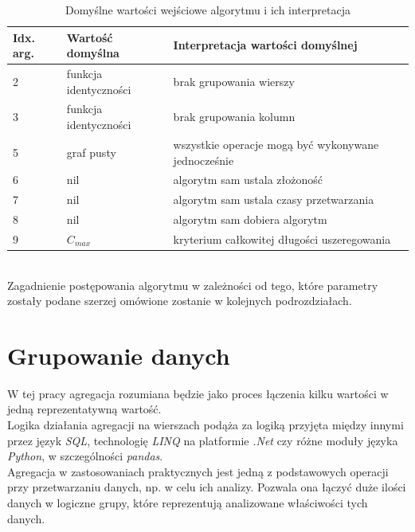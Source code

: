 \documentclass[brudnopis]{xmgr}
\begin{document}

\begin{table}[!tbh]
\begin{tabular}{|l|l|l|} \hline
Idx. arg. & Wartość domyślna & Interpretacja wartości domyślnej \\ \hline
2 & funkcja identyczności   & brak grupowania wierszy \\ \hline
3 & funkcja identyczności   & brak grupowania kolumn \\ \hline
5 & graf pusty              & wszystkie operacje mogą być wykonywane jednocześnie \\ \hline
6 & nil                     & algorytm sam ustala złożoność \\ \hline
7 & nil                     & algorytm sam ustala czasy przetwarzania \\ \hline
8 & nil                     & algorytm sam dobiera algorytm \\ \hline
9 & $C_{max}$               & kryterium całkowitej długości uszeregowania \\ \hline
\end{tabular}
\caption{Domyślne wartości wejściowe algorytmu i ich interpretacja\label{tab:args-default}}
\end{table}
\medskip\\

Zagadnienie postępowania algorytmu w zależności od tego, które parametry zostały podane szerzej omówione zostanie w kolejnych podrozdziałach.

\section{Grupowanie danych}

W tej pracy agregacja rozumiana będzie jako proces łączenia kilku wartości w jedną reprezentatywną wartość.
\medskip\\

Logika działania agregacji na wierszach podąża za logiką przyjęta między innymi przez język \emph{SQL}, technologię \emph{LINQ} na platformie \emph{.Net} czy różne moduły języka \emph{Python}, w szczególności \emph{pandas}.
\medskip\\

Agregacja w zastosowaniach praktycznych jest jedną z podstawowych operacji przy przetwarzaniu danych, np. w celu ich analizy.
Pozwala ona łączyć duże ilości danych w logiczne grupy, które reprezentują analizowane właściwości tych danych.
\medskip\\
\end{document}
